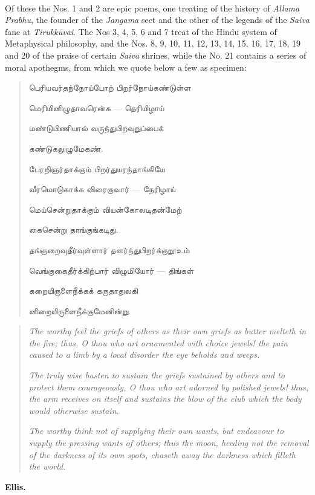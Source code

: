 \documentclass{article}
\newcommand{\TamilText}[1]{\texttamil{#1}}
\newcommand{\tam}[1]{\TamilText{#1}}
\begin{document}
\paragraph{}
Of these the Nos. 1 and 2 are epic poems, one treating of the history of \emph{Allama Prabhu}, the founder of the \emph{Jangama} sect and the other of the legends of the \emph{Saiva} fane at \emph{Tirukk\={u}vai}. The Nos 3, 4, 5, 6 and 7 treat of the Hindu system of Metaphysical philosophy, and the Nos. 8, 9, 10, 11, 12, 13, 14, 15, 16, 17, 18, 19 and 20 of the praise of certain \emph{Saiva} shrines, while the No. 21 contains a series of moral apothegms, from which we quote below a few as specimen:
\begin{quotation}\small
\tam{பெரியவர்தந்நோய்போற்‌ பிறர்நோய்கண்டுள்ள}

\tam{மெரியினிழுதாவரென்க} --- \tam{தெரியிழாய்‌}

\tam{மண்டுபிணியால்‌ வருந்துபிறவுறுப்பைக்}

\tam{கண்டுகலுழுமேகண்‌}.

\bigskip

\tam{பேரறிஞர்தாக்கும்‌ பிறர்துயரந்தாங்கியே}

\tam{வீரமொடுகாக்க விரைகுவார்‌} --- \tam{நேரிழாய்‌}

\tam{மெய்சென்றுதாக்கும்‌ வியன்கோலடிதன்மேற்‌}

\tam{கைசென்று தாங்குங்கடிது}.

\bigskip

\tam{தங்குறைவுதீர்வுள்ளார்‌ தளர்ந்துபிறர்க்குறூஉம்}

\tam{வெங்குகைதீர்க்கிற்பார்‌ விழுமியோர்} --- \tam{திங்கள்‌}

\tam{கறையிருளைநீக்கக்‌ கருதாதுலகி}

\tam{னிறையிருளைநீக்குமேனின்று}.
\end{quotation}
\begin{quotation}\small
\emph{The worthy feel the griefs of others as their own griefs as butter melteth in the fire; thus, O thou who art ornamented with choice jewels! the pain caused to a limb by a local disorder the eye beholds and weeps.}

\emph{The truly wise hasten to sustain the griefs sustained by others and to protect them courageously, O thou who art adorned by polished jewels! thus, the arm receives on itself and sustains the blow of the club which the body would otherwise sustain.}

\emph{The worthy think not of supplying their own wants, but endeavour to supply the pressing wants of others; thus the moon, heeding not the removal of the darkness of its own spots, chaseth away the darkness which filleth the world.}
\end{quotation}
\begin{flushright}\textbf{Ellis.}\end{flushright}
\end{document}
